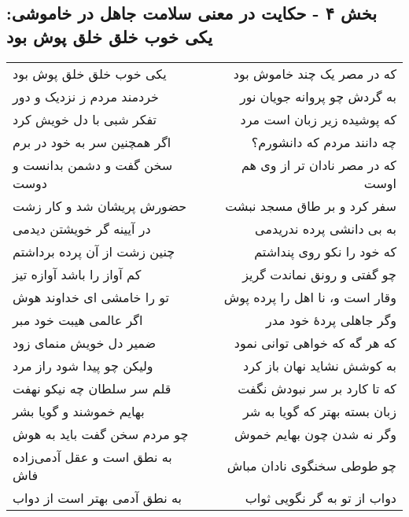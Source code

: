 \begin{center}
\section*{بخش ۴ - حکایت در معنی سلامت جاهل در خاموشی: یکی خوب خلق خلق پوش بود}
\label{sec:004}
\begin{longtable}{l p{0.5cm} r}
یکی خوب خلق خلق پوش بود
&&
که در مصر یک چند خاموش بود
\\
خردمند مردم ز نزدیک و دور
&&
به گردش چو پروانه جویان نور
\\
تفکر شبی با دل خویش کرد
&&
که پوشیده زیر زبان است مرد
\\
اگر همچنین سر به خود در برم
&&
چه دانند مردم که دانشورم؟
\\
سخن گفت و دشمن بدانست و دوست
&&
که در مصر نادان تر از وی هم اوست
\\
حضورش پریشان شد و کار زشت
&&
سفر کرد و بر طاق مسجد نبشت
\\
در آیینه گر خویشتن دیدمی
&&
به بی دانشی پرده ندریدمی
\\
چنین زشت از آن پرده برداشتم
&&
که خود را نکو روی پنداشتم
\\
کم آواز را باشد آوازه تیز
&&
چو گفتی و رونق نماندت گریز
\\
تو را خامشی ای خداوند هوش
&&
وقار است و، نا اهل را پرده پوش
\\
اگر عالمی هیبت خود مبر
&&
وگر جاهلی پردهٔ خود مدر
\\
ضمیر دل خویش منمای زود
&&
که هر گه که خواهی توانی نمود
\\
ولیکن چو پیدا شود راز مرد
&&
به کوشش نشاید نهان باز کرد
\\
قلم سر سلطان چه نیکو نهفت
&&
که تا کارد بر سر نبودش نگفت
\\
بهایم خموشند و گویا بشر
&&
زبان بسته بهتر که گویا به شر
\\
چو مردم سخن گفت باید به هوش
&&
وگر نه شدن چون بهایم خموش
\\
به نطق است و عقل آدمی‌زاده فاش
&&
چو طوطی سخنگوی نادان مباش
\\
به نطق آدمی بهتر است از دواب
&&
دواب از تو به گر نگویی ثواب
\\
\end{longtable}
\end{center}
